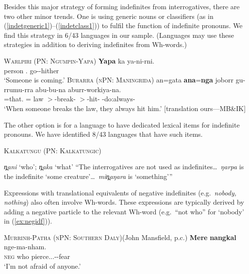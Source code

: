 \documentclass[12pt,egregdoesnotlikesansseriftitles]{scrartcl}
\begin{document}
Besides this major strategy of forming indefinites from interrogatives, there are two other minor trends. One is using generic nouns or classifiers (as in (\ref{indetgeneric1})--(\ref{indetclass1})) to fulfil the function of indefinite pronouns. We find this strategy in 6/43 languages in our sample. (Languages may use these strategies in addition to deriving indefinites from Wh-words.)
\begin{exe}
  \ex \textsc{Warlpiri (PN: Ngumpin-Yapa)} \hfill \citep{wdp}
  \gll \textbf{Yapa} ka ya-ni-rni.\\
  person \Aux.\Prs{} go-\Np-hither\\
  `Someone is coming.' \label{indetgeneric1}  
  \ex\label{indetclass1} \textsc{Burarra (nPN: Maningrida)}\hfill {}
  \gll an=gata    \textbf{ana}=\textbf{nga}            joborr    gu-rrumu-rra  abu-bu-na            aburr-workiya-na.\\
  \Third\Min=that.\Rcgn{}   \Third\Min\Hum=\Indet{}   law     \Third\Min$>$\Third\Min-break-\Pc{}  \Third\Aug$>$\Third\Min-hit-\Pc{}    \Third\Aug-do:always-\Pc\\
  \glt `When someone breaks the law, they always hit him.' [translation ours---MB\&IK]
  \end{exe}
  
The other option is for a language to have dedicated lexical items for indefinite pronouns. We have identified 8/43 languages that have such items.
\begin{exe}
  \ex \textsc{Kalkatungu (PN: Kalkatungic)}\hfill {}
  \begin{xlist}
    \ex \textit{\charis n̪ani} `who'; \textit{\charis n̪aka} `what'
    \ex ``The interrogatives are not used as indefinites\ldots\ \textit{\charis ŋarpa} is the indefinite `some creature'\ldots\ \textit{\charis min̪aŋara} is `something'\thinspace''
  \end{xlist}
\end{exe}

Expressions with translational equivalents of negative indefinites (e.g.\ \textit{nobody, nothing})  also often involve Wh-words. These expressions are typically derived by adding a negative particle to the relevant Wh-word (e.g.\ ``not who'' for `nobody' in (\ref{ex:negidf})).

\begin{exe}
  \ex\label{ex:negidf} \textsc{Murrinh-Patha (nPN: Southern Daly)}\hfill (John Mansfield, p.c.)
  \gll \textbf{Mere} \textbf{nangkal} nge-ma-nham.\\
  \textsc{neg} who pierce.\Rr.\Fsg.\Irr-\Appl-fear\\
  \glt `I'm not afraid of anyone.' %
\end{exe}
\end{document}
